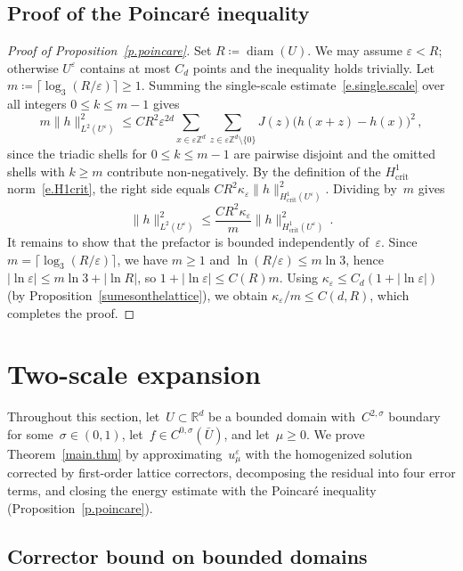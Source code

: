 \documentclass[11pt]{amsart}
\theoremstyle{plain}
\theoremstyle{definition}
\theoremstyle{remark}
\newcommand{\Zd}{\mathbb{Z}^d}
\newcommand{\Rd}{\mathbb{R}^d}
\newcommand{\eps}{\varepsilon}
\begin{document}
	\subsection{Proof of the Poincar\'e inequality}
	
	\begin{proof}[Proof of Proposition~\ref{p.poincare}]
		Set $R \coloneqq \operatorname{diam}(U)$.
		We may assume $\eps < R$; otherwise $U^\eps$ contains at most $C_d$ points and the inequality holds trivially.
		Let $m \coloneqq \lceil \log_3(R/\eps) \rceil \ge 1$.
		Summing the single-scale estimate~\eqref{e.single.scale} over all integers $0 \le k \le m - 1$ gives
		\[
		m \|h\|_{L^2(U^\eps)}^2
		\le
		C R^2 \eps^{2d}
		\sum_{x \in \eps\Zd}
		\sum_{z \in \eps\Zd \setminus \{0\}}
		J(z)\bigl(h(x{+}z) - h(x)\bigr)^2\,,
		\]
		since the triadic shells for $0 \le k \le m - 1$ are pairwise disjoint and the omitted shells with $k \ge m$ contribute non-negatively.
		By the definition of the $H^1_{\mathrm{crit}}$ norm~\eqref{e.H1crit}, the right side equals $C R^2 \kappa_\eps \|h\|_{H^1_{\mathrm{crit}}(U^\eps)}^2$.
		Dividing by~$m$ gives
		\[
		\|h\|_{L^2(U^\eps)}^2 \le \frac{C R^2 \kappa_\eps}{m} \|h\|_{H^1_{\mathrm{crit}}(U^\eps)}^2\,.
		\]
		It remains to show that the prefactor is bounded independently of~$\eps$.
		Since $m = \lceil \log_3(R/\eps) \rceil$, we have $m \ge 1$ and $\ln(R/\eps) \le m \ln 3$, hence $|\ln\eps| \le m \ln 3 + |\ln R|$, so $1 + |\ln\eps| \le C(R) m$.
		Using $\kappa_\eps \le C_d(1 + |\ln\eps|)$ (by Proposition~\ref{sumesonthelattice}), we obtain $\kappa_\eps / m \le C(d, R)$, which completes the proof.
	\end{proof}
	
	
	\section{Two-scale expansion}
	\label{sec:twoscale}
	
	Throughout this section, let~$U \subset \Rd$ be a bounded domain with~$C^{2,\sigma}$ boundary for some~$\sigma \in (0,1)$, let~$f \in C^{0,\sigma}(\bar U)$, and let~$\mu \ge 0$.
	We prove Theorem~\ref{main.thm} by approximating~$u^\eps_\mu$ with the homogenized solution corrected by first-order lattice correctors, decomposing the residual into four error terms, and closing the energy estimate with the Poincar\'e inequality (Proposition~\ref{p.poincare}).
	
	
	\subsection{Corrector bound on bounded domains}
	
\end{document}
